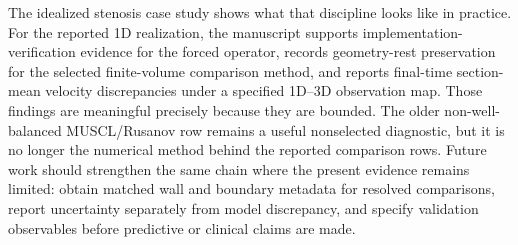 The idealized stenosis case study shows what that discipline looks like in
practice. For the reported 1D realization, the manuscript supports
implementation-verification evidence for the forced operator, records
geometry-rest preservation for the selected finite-volume comparison method,
and reports final-time section-mean velocity discrepancies under a specified
1D--3D observation map. Those findings are meaningful precisely because they
are bounded. The older non-well-balanced MUSCL/Rusanov row remains a useful
nonselected diagnostic, but it is no longer the numerical method behind the
reported comparison rows. Future work should strengthen the same chain where
the present evidence remains limited: obtain matched wall and boundary metadata
for resolved comparisons, report uncertainty separately from model discrepancy,
and specify validation observables before predictive or clinical claims are
made.
